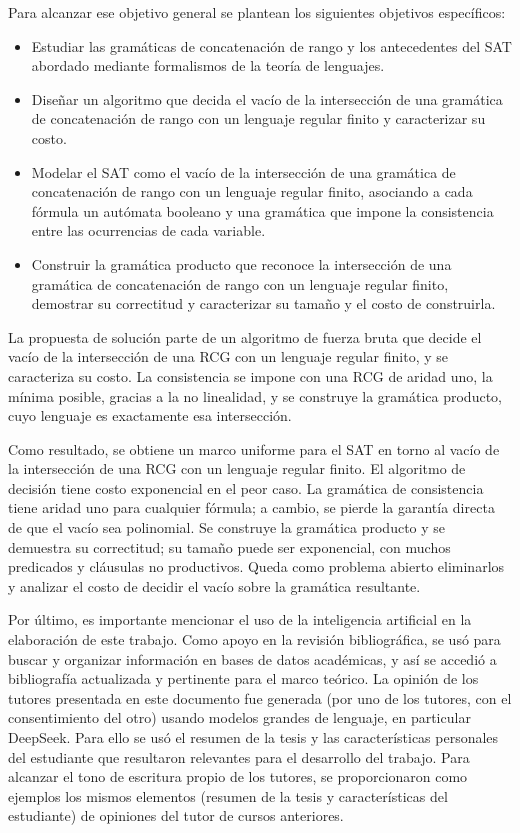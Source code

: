 Para alcanzar ese objetivo general se plantean los siguientes objetivos
específicos:
\begin{itemize}
  \item Estudiar las gramáticas de concatenación de rango y los
    antecedentes del SAT abordado mediante formalismos de la teoría de
    lenguajes.
  \item Diseñar un algoritmo que decida el vacío de la intersección de una
    gramática de concatenación de rango con un lenguaje regular finito y
    caracterizar su costo.
  \item Modelar el SAT como el vacío de la intersección de una gramática
    de concatenación de rango con un lenguaje regular finito, asociando a
    cada fórmula un autómata booleano y una gramática que impone la
    consistencia entre las ocurrencias de cada variable.
  \item Construir la gramática producto que reconoce la intersección de
    una gramática de concatenación de rango con un lenguaje regular finito,
    demostrar su correctitud y caracterizar su tamaño y el costo de
    construirla.
\end{itemize}

La propuesta de solución parte de un algoritmo de fuerza bruta que decide
el vacío de la intersección de una RCG con un lenguaje regular finito, y
se caracteriza su costo. La consistencia se impone con una RCG de aridad
uno, la mínima posible, gracias a la no linealidad, y se construye la
gramática producto,
cuyo lenguaje es exactamente esa intersección.

Como resultado, se obtiene un marco uniforme para el SAT en torno al
vacío de la intersección de una RCG con un lenguaje regular finito. El
algoritmo de decisión tiene costo exponencial en el peor caso. La
gramática de consistencia tiene aridad uno para cualquier fórmula; a
cambio, se pierde la garantía directa de que el vacío sea polinomial. Se
construye la gramática producto y se demuestra su correctitud; su tamaño
puede ser exponencial, con muchos predicados y cláusulas no productivos.
Queda como problema abierto eliminarlos y analizar el costo de decidir el
vacío sobre la gramática resultante.

Por último, es importante mencionar el uso de la inteligencia
artificial en la elaboración de este trabajo. Como apoyo en la revisión
bibliográfica, se usó para buscar y organizar información en bases de
datos académicas, y así se accedió a bibliografía actualizada y
pertinente para el marco teórico. La opinión de los tutores
presentada en este documento fue generada (por uno de los tutores, con
el consentimiento del otro) usando modelos
grandes de lenguaje, en particular DeepSeek. Para ello se usó el resumen
de la tesis y las características personales del estudiante que resultaron
relevantes para el desarrollo del trabajo. Para alcanzar el tono de
escritura propio de los tutores, se proporcionaron como ejemplos los
mismos elementos (resumen de la tesis y características del estudiante) de
opiniones del tutor de cursos anteriores.

